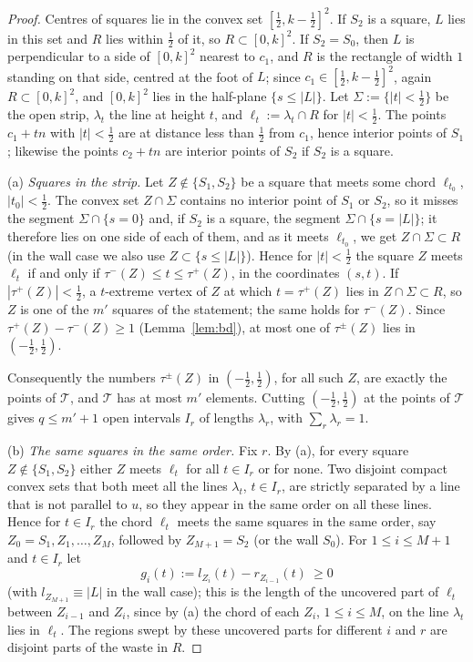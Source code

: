 \documentclass[11pt]{amsart}
\theoremstyle{definition}
\theoremstyle{remark}
\begin{document}
\begin{proof}
Centres of squares lie in the convex set $[\frac12,k-\frac12]^2$. If $S_2$ is a square, $L$ lies in this set and $R$
lies within $\frac12$ of it, so $R\subset[0,k]^2$. If $S_2=S_0$, then $L$ is perpendicular to a side of $[0,k]^2$ nearest
to $c_1$, and $R$ is the rectangle of width $1$ standing on that side, centred at the foot of $L$; since
$c_1\in[\frac12,k-\frac12]^2$, again $R\subset[0,k]^2$, and $[0,k]^2$ lies in the half-plane $\{s\le|L|\}$.
Let $\Sigma:=\{|t|<\frac12\}$ be the open strip, $\lambda_t$ the line at height $t$, and $\ell_t:=\lambda_t\cap R$ for $|t|<\frac12$.
The points $c_1+tn$ with $|t|<\frac12$ are at distance less than $\frac12$ from $c_1$, hence interior points of $S_1$;
likewise the points $c_2+tn$ are interior points of $S_2$ if $S_2$ is a square.

(a) \emph{Squares in the strip.} Let $Z\notin\{S_1,S_2\}$ be a square that meets some chord $\ell_{t_0}$, $|t_0|<\frac12$. The
convex set $Z\cap\Sigma$ contains no interior point of $S_1$ or $S_2$, so it misses the segment $\Sigma\cap\{s=0\}$ and, if $S_2$
is a square, the segment $\Sigma\cap\{s=|L|\}$; it therefore lies on one side of each of them, and as it meets $\ell_{t_0}$, we get
$Z\cap\Sigma\subset R$ (in the wall case we also use $Z\subset\{s\le|L|\}$). Hence for $|t|<\frac12$ the square $Z$ meets $\ell_t$
if and only if $\tau^-(Z)\le t\le\tau^+(Z)$, in the coordinates $(s,t)$. If $|\tau^+(Z)|<\frac12$, a $t$-extreme vertex of $Z$
at which $t=\tau^+(Z)$ lies in $Z\cap\Sigma\subset R$, so $Z$ is one of the $m'$ squares of the statement; the same holds for
$\tau^-(Z)$. Since $\tau^+(Z)-\tau^-(Z)\ge1$ (Lemma~\ref{lem:bd}), at most one of $\tau^\pm(Z)$ lies in $(-\frac12,\frac12)$.

Consequently the numbers $\tau^\pm(Z)$ in $(-\frac12,\frac12)$, for all such $Z$, are exactly the points of $\mathcal T$, and
$\mathcal T$ has at most $m'$ elements. Cutting $(-\frac12,\frac12)$ at the points of $\mathcal T$ gives $q\le m'+1$ open intervals
$I_r$ of lengths $\lambda_r$, with $\sum_r\lambda_r=1$.

(b) \emph{The same squares in the same order.} Fix $r$. By (a), for every square $Z\notin\{S_1,S_2\}$ either $Z$ meets $\ell_t$
for all $t\in I_r$ or for none. Two disjoint compact convex sets that both meet all the lines $\lambda_t$, $t\in I_r$, are
strictly separated by a line that is not parallel to $u$, so they appear in the same order on all these lines. Hence for
$t\in I_r$ the chord $\ell_t$ meets the same squares in the same order, say $Z_0=S_1,Z_1,\dots,Z_M$, followed by $Z_{M+1}=S_2$
(or the wall $S_0$). For $1\le i\le M+1$ and $t\in I_r$ let
\[
g_i(t):=l_{Z_i}(t)-r_{Z_{i-1}}(t)\ \ge0
\]
(with $l_{Z_{M+1}}\equiv|L|$ in the wall case); this is the length of the uncovered part of $\ell_t$ between $Z_{i-1}$ and
$Z_i$, since by (a) the chord of each $Z_i$, $1\le i\le M$, on the line $\lambda_t$ lies in $\ell_t$. The regions swept by these
uncovered parts for different $i$ and $r$ are disjoint parts of the waste in $R$.


\end{proof}
\end{document}
